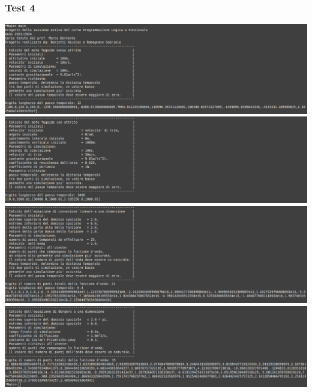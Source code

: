 \subsubsection*{Test 4}
\includegraphics[width=\textwidth,height=\textheight,keepaspectratio]{05_testing/image/hs/04_test/01_normale.png}
\\
\includegraphics[width=\textwidth,height=\textheight,keepaspectratio]{05_testing/image/hs/04_test/02_normale.png}
\\
\includegraphics[width=\textwidth,height=\textheight,keepaspectratio]{05_testing/image/hs/04_test/03_normale.png}
\\
\includegraphics[width=\textwidth,height=\textheight,keepaspectratio]{05_testing/image/hs/04_test/04_normale.png}

